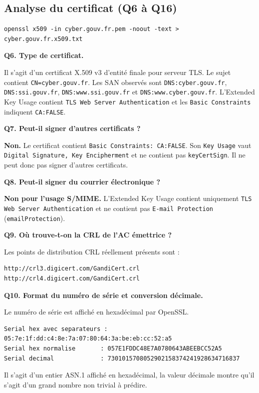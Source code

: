\documentclass[11pt,a4paper]{article}
\begin{document}
\subsection{Analyse du certificat (Q6 à Q16)}
\begin{lstlisting}[style=cmd]
openssl x509 -in cyber.gouv.fr.pem -noout -text > cyber.gouv.fr.x509.txt
\end{lstlisting}

\textbf{Q6. Type de certificat.}
\begin{reponse}
Il s'agit d'un certificat X.509 v3 d'entité finale pour serveur TLS. Le sujet contient
\texttt{CN=cyber.gouv.fr}. Les SAN observés sont \texttt{DNS:cyber.gouv.fr},
\texttt{DNS:ssi.gouv.fr}, \texttt{DNS:www.ssi.gouv.fr} et
\texttt{DNS:www.cyber.gouv.fr}. L'Extended Key Usage contient
\texttt{TLS Web Server Authentication} et les \texttt{Basic Constraints} indiquent
\texttt{CA:FALSE}.
\end{reponse}

\textbf{Q7. Peut-il signer d'autres certificats ?}
\begin{reponse}
\textbf{Non.} Le certificat contient \texttt{Basic Constraints: CA:FALSE}. Son
\texttt{Key Usage} vaut \texttt{Digital Signature, Key Encipherment} et ne contient pas
\texttt{keyCertSign}. Il ne peut donc pas signer d'autres certificats.
\end{reponse}

\textbf{Q8. Peut-il signer du courrier électronique ?}
\begin{reponse}
\textbf{Non pour l'usage S/MIME.} L'Extended Key Usage contient uniquement
\texttt{TLS Web Server Authentication} et ne contient pas \texttt{E-mail Protection}
(\texttt{emailProtection}).
\end{reponse}

\textbf{Q9. Où trouve-t-on la CRL de l'AC émettrice ?}
\begin{reponse}
Les points de distribution CRL réellement présents sont :
\begin{lstlisting}[style=out]
http://crl3.digicert.com/GandiCert.crl
http://crl4.digicert.com/GandiCert.crl
\end{lstlisting}
\end{reponse}

\textbf{Q10. Format du numéro de série et conversion décimale.}
\begin{reponse}
Le numéro de série est affiché en hexadécimal par OpenSSL.
\begin{lstlisting}[style=out]
Serial hex avec separateurs : 05:7e:1f:dd:c4:8e:7a:07:80:64:3a:be:eb:cc:52:a5
Serial hex normalise       : 057E1FDDC48E7A0780643ABEEBCC52A5
Serial decimal             : 7301015708052902158374241928634716837
\end{lstlisting}
Il s'agit d'un entier ASN.1 affiché en hexadécimal, la valeur décimale montre qu'il
s'agit d'un grand nombre non trivial à prédire.
\end{reponse}
\end{document}
